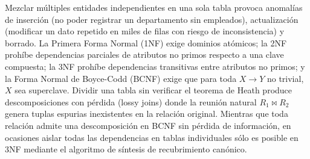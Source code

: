 \documentclass{book}
\begin{document}
Mezclar múltiples entidades independientes en una sola tabla provoca anomalías de inserción (no poder registrar un departamento sin empleados), actualización (modificar un dato repetido en miles de filas con riesgo de inconsistencia) y borrado. La Primera Forma Normal (1NF) exige dominios atómicos; la 2NF prohíbe dependencias parciales de atributos no primos respecto a una clave compuesta; la 3NF prohíbe dependencias transitivas entre atributos no primos; y la Forma Normal de Boyce-Codd (BCNF) exige que para toda \(X \to Y\) no trivial, \(X\) sea superclave.
Dividir una tabla sin verificar el teorema de Heath produce descomposiciones con pérdida (lossy joins) donde la reunión natural \(R_1 \bowtie R_2\) genera tuplas espurias inexistentes en la relación original. Mientras que toda relación admite una descomposición en BCNF sin pérdida de información, en ocasiones aislar todas las dependencias en tablas individuales sólo es posible en 3NF mediante el algoritmo de síntesis de recubrimiento canónico.
\end{document}
